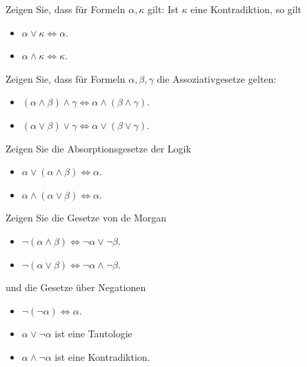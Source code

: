 \medskip

\begin{aufgabe}\label{logik_aufgabe_kontradik}
Zeigen Sie, dass für Formeln $\alpha, \kappa$ gilt: 
Ist $\kappa$ eine Kontradiktion, so gilt
\vspace{-0.2cm}
\begin{itemize}
\item $\alpha \vee \kappa \iff \alpha$.
\item $\alpha \wedge \kappa \iff \kappa $.
\end{itemize}
\end{aufgabe} 

\begin{aufgabe}\label{logik_aufgabe_4} 
Zeigen Sie, dass für Formeln $\alpha, \beta, \gamma$  die Assoziativgesetze gelten:
\vspace{-0.2cm}
\begin{itemize}
\item $(\alpha \wedge \beta) \wedge \gamma \iff \alpha \wedge (\beta \wedge \gamma)$.
\item $(\alpha \vee \beta) \vee \gamma \iff \alpha \vee (\beta \vee \gamma)$.
\end{itemize}
\end{aufgabe}

\begin{aufgabe}\label{logik_aufgabe_absorp} Zeigen Sie die Absorptionsgesetze der Logik

\begin{itemize}
\item $\alpha \vee (\alpha \wedge \beta) \iff \alpha $.
\item $\alpha \wedge (\alpha \vee \beta)  \iff \alpha $.
\end{itemize}
\end{aufgabe}

\begin{aufgabe}\label{logik_aufgabe_dem_neg}  Zeigen Sie die Gesetze von de Morgan

\begin{itemize}
\item $\neg(\alpha \wedge \beta)  \iff  \neg \alpha \vee \neg \beta $.
\item $\neg(\alpha \vee \beta)  \iff \neg \alpha \wedge \neg \beta $.
\end{itemize}

und die Gesetze über Negationen

\begin{itemize}
\item $\neg ( \neg \alpha) \iff \alpha$.
\item $\alpha \vee \neg \alpha$ ist eine Tautologie
\item $\alpha \wedge \neg \alpha $ ist eine Kontradiktion.
\end{itemize}
\end{aufgabe}

